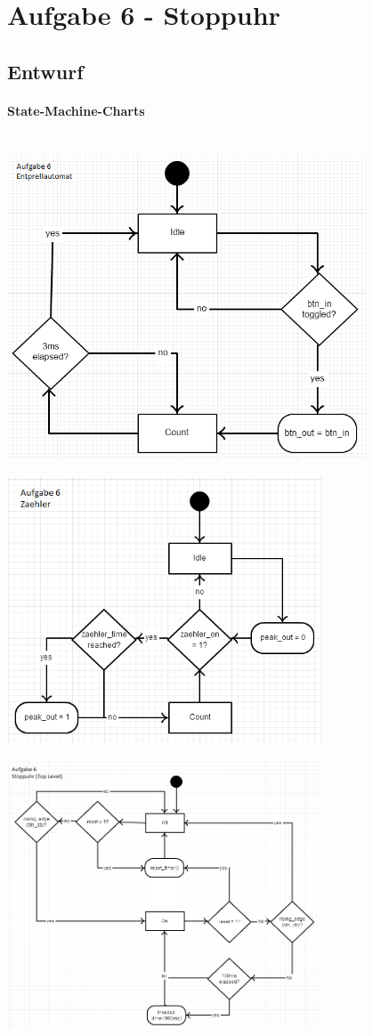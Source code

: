 \section{Aufgabe 6 - Stoppuhr}
\subsection{Entwurf}
	\paragraph{State-Machine-Charts}\hfill \\

		\includegraphics[width=0.8\textwidth]{resources/06-Entprellautomat.png}
		

		\includegraphics[width=0.7\textwidth]{resources/06-Zaehler.png}

		\includegraphics[width=0.7\textwidth]{resources/06-Stoppuhr.png}
 
